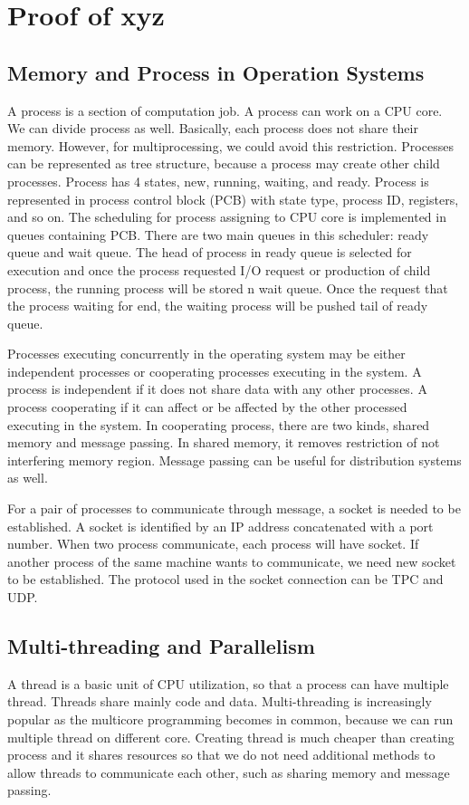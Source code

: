 \chapter{Proof of xyz}
\label{appendix}
\thispagestyle{myheadings}

\graphicspath{{Appendix/Figures/}}

\section{Memory and Process in Operation Systems}
\label{sec:history}
A process is a section of computation job. A process can work on a CPU core. We can divide process as well.
Basically, each process does not share their memory. However, for multiprocessing, we could avoid this restriction.
Processes can be represented as tree structure, because a process may create other child processes.
Process has 4 states, new, running, waiting, and ready. 
Process is represented in process control block (PCB) with state type, process ID, registers, and so on.
The scheduling for process assigning to CPU core is implemented in queues containing PCB. There are two main queues in this scheduler: 
ready queue and wait queue. The head of process in ready queue is selected for execution and once the process requested I/O request or 
production of child process, the running process will be stored n wait queue. Once the request that the process waiting for end, 
the waiting process will be pushed tail of ready queue. 

Processes executing concurrently in the operating system may be either independent processes or cooperating processes executing in the system.
A process is independent if it does not share data with any other processes. A process cooperating if it can affect or be affected by the 
other processed executing in the system. In cooperating process, there are two kinds, shared memory and message passing. 
In shared memory, it removes restriction of not interfering memory region. Message passing can be useful for distribution systems as well.

For a pair of processes to communicate through message, a socket is needed to be established. 
A socket is identified by an IP address concatenated with a port number. When two process communicate, each process will have socket. 
If another process of the same machine wants to communicate, we need new socket to be established. The protocol used in the socket connection
can be TPC and UDP.

\section{Multi-threading and Parallelism}
\label{sec:history}
A thread is a basic unit of CPU utilization, so that a process can have multiple thread. Threads share mainly code and data. 
Multi-threading is increasingly popular as the multicore programming becomes in common, because we can run multiple thread on different core.
Creating thread is much cheaper than creating process and it shares resources so that we do not need additional methods to allow threads to 
communicate each other, such as sharing memory and message passing.

